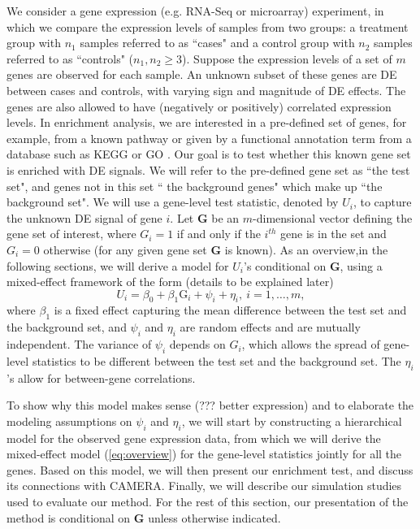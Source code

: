 	We consider a gene expression (e.g. RNA-Seq or microarray) experiment, in which we compare the 
	expression levels of samples from two groups: a treatment group with $n_1$ samples referred to 
	as ``cases" and a control group with $n_2$ samples referred to as ``controls" ($n_1,n_2\ge 3$). 
	Suppose the expression levels of a set of $m$ genes are observed for each sample. An unknown 
	subset of these genes are DE between cases and controls, with varying sign and magnitude of DE 
	effects. The genes are also allowed to have (negatively or positively) correlated expression 
	levels. In enrichment analysis, we are interested in a pre-defined set of genes, for example, 
	from a known pathway or given by a functional annotation term from a database such as KEGG
	\citep{kanehisa2000kegg} or GO \citep{ashburner2000gene}. Our goal is to test whether this known
	gene set is enriched with DE signals. We will refer to the pre-defined gene set as ``the test 
	set", and genes not in this set `` the background genes" which make up ``the background set".
	 We will use a gene-level test statistic, denoted by $U_i$, to capture the unknown DE signal of 
	 gene $i$. Let $\bm G$ be an $m$-dimensional vector defining the gene set of interest, where 
	 $G_i=1$ if and only if the $i^{th}$ gene is in 
	the set and $G_i=0$ otherwise (for any given gene set $\bm G$ is known). 
	As an overview,in the following sections, we will derive a model for $ U_i$'s conditional on 
	$\bm G$, using a mixed-effect framework of the form (details to be explained later)
		\begin{equation}\label{eq:overview}
		U_i = \beta_0 + \beta_1\text{G}_i  + \psi_i  + \eta_i, ~i = 1, \ldots, m,  
		\end{equation}
	where $\beta_1$ is a fixed effect capturing the mean difference between the test set and the 
	background set, and $\psi_i$ and $\eta_i$ are random effects and are mutually independent.
	 The variance of $\psi_i$ depends on $G_i$, which allows the spread of gene-level 
	 statistics to be different between the test set and the background set. The $\eta_i$'s allow  
	 for between-gene correlations. 
		
	 To show why this model makes sense (??? better expression) and to elaborate the modeling 
	 assumptions on $\psi_i$ 
	 and $\eta_i$, we will start by constructing a hierarchical model for the observed gene 
	 expression data, from which we will derive the mixed-effect model (\ref{eq:overview}) for the 
	 gene-level statistics jointly for all the genes. Based on this model, we will then present our 
	 enrichment test, and 
	discuss its connections with CAMERA. Finally, we will describe our simulation studies used to 
	evaluate our method. For the rest of this section, our presentation of the method is 
	conditional on $\bm G$ unless otherwise indicated.
	
